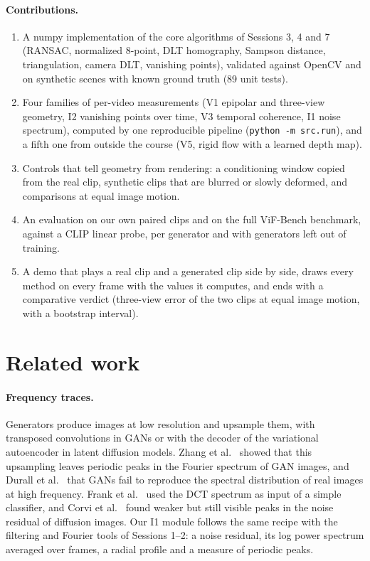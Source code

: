 \documentclass[11pt,a4paper]{article}
\begin{document}
\paragraph{Contributions.}
\begin{enumerate}
  \item A numpy implementation of the core algorithms of Sessions 3, 4 and 7 (RANSAC, normalized
        8-point, DLT homography, Sampson distance, triangulation, camera DLT, vanishing points),
        validated against OpenCV and on synthetic scenes with known ground truth (89 unit tests).
  \item Four families of per-video measurements (V1 epipolar and three-view geometry,
        I2 vanishing points over time, V3 temporal coherence, I1 noise spectrum), computed by
        one reproducible pipeline (\texttt{python -m src.run}), and a fifth one from outside the
        course (V5, rigid flow with a learned depth map).
  \item Controls that tell geometry from rendering: a conditioning window copied from the
        real clip, synthetic clips that are blurred or slowly deformed, and comparisons at
        equal image motion.
  \item An evaluation on our own paired clips and on the full ViF-Bench benchmark, against a
        CLIP linear probe, per generator and with generators left out of training.
  \item A demo that plays a real clip and a generated clip side by side, draws every
        method on every frame with the values it computes, and ends with a comparative verdict
        (three-view error of the two clips at equal image motion, with a bootstrap interval).
\end{enumerate}

\section{Related work}

\paragraph{Frequency traces.}
Generators produce images at low resolution and upsample them, with transposed
convolutions in GANs or with the decoder of the variational autoencoder in latent diffusion
models. Zhang et al.\ \cite{zhang2019} showed that this upsampling leaves periodic peaks in
the Fourier spectrum of GAN images, and Durall et al.\ \cite{durall2020} that GANs fail to
reproduce the spectral distribution of real images at high frequency. Frank et al.\
\cite{frank2020} used the DCT spectrum as input of a simple classifier, and Corvi et al.\
\cite{corvi2023} found weaker but still visible peaks in the noise residual of diffusion
images. Our I1 module follows the same recipe with the filtering and Fourier tools of
Sessions 1--2: a noise residual, its log power spectrum averaged over frames, a radial
profile and a measure of periodic peaks.
\end{document}
